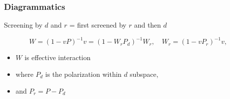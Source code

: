 \documentclass{beamer}
\begin{document}
\begin{frame}
\frametitle{Diagrammatics}

Screening by $d$ and $r$ = first screened by $r$ and then $d$

\begin{equation}
    W = (1 - v P)^{-1} v = (1 - W_r P_d)^{-1} W_r, \quad 
    W_r = (1 - v P_r)^{-1} v,
\end{equation}
\begin{itemize}
    \item $W$ is effective interaction 
    \item where $P_d$ is the polarization within $d$ subspace,
    \item and $P_r = P - P_d$
\end{itemize}

\begin{center}
    
\end{center}

\end{frame}
\end{document}
